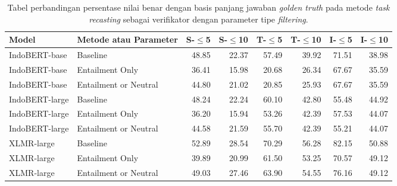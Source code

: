 \begin{table}[H]\centering
\small
\begin{tabular}{llrrrrrr}
\toprule
         Model &                Metode atau Parameter &  S-$\leq$5 &  S-$\leq$10 &  T-$\leq$5 &  T-$\leq$10 &  I-$\leq$5 &  I-$\leq$10 \\
\midrule
 IndoBERT-base &              Baseline &                48.85 &                 22.37 &                57.49 &                 39.92 &                71.51 &                 38.98 \\
 IndoBERT-base &       Entailment Only &                36.41 &                 15.98 &                20.68 &                 26.34 &                67.67 &                 35.59 \\
 IndoBERT-base & Entailment or Neutral &                44.80 &                 21.02 &                20.85 &                 25.93 &                67.67 &                 35.59 \\
\hline
IndoBERT-large &              Baseline &                48.24 &                 22.24 &                60.10 &                 42.80 &                55.48 &                 44.92 \\
IndoBERT-large &       Entailment Only &                36.20 &                 15.94 &                53.26 &                 42.39 &                57.53 &                 44.07 \\
IndoBERT-large & Entailment or Neutral &                44.58 &                 21.59 &                55.70 &                 42.39 &                55.21 &                 44.07 \\
\hline
    XLMR-large &              Baseline &                52.89 &                 28.54 &                70.29 &                 56.28 &                82.15 &                 50.88 \\
    XLMR-large &       Entailment Only &                39.89 &                 20.99 &                61.50 &                 53.25 &                70.57 &                 49.12 \\
    XLMR-large & Entailment or Neutral &                49.03 &                 27.46 &                63.90 &                 54.55 &                76.16 &                 49.12 \\
\bottomrule
\end{tabular}
\caption{Tabel perbandingan persentase nilai benar dengan basis panjang jawaban \emph{golden truth} pada metode \emph{task recasting} sebagai verifikator dengan parameter tipe \emph{filtering}.}
\end{table}


